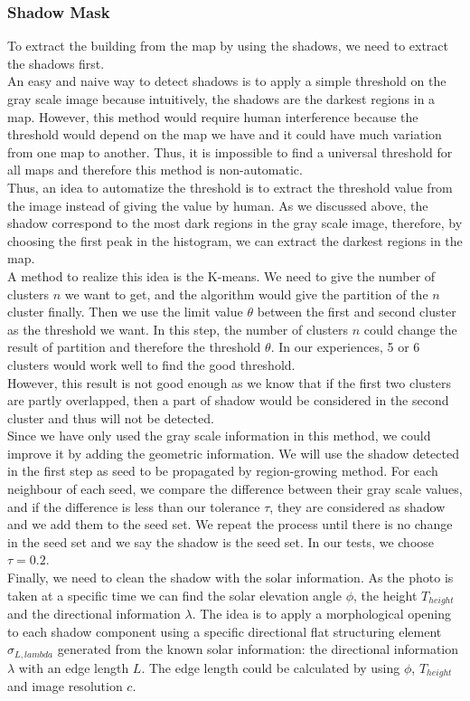 \documentclass[runningheads]{llncs}
\begin{document}
\subsubsection{Shadow Mask} 
To extract the building from the map by using the shadows, we need to extract the shadows first. \\
An easy and naive way to detect shadows is to apply a simple threshold on the gray scale image because intuitively, the shadows are the darkest regions in a map. However, this method would require human interference because the threshold would depend on the map we have and it could have much variation from one map to another. Thus, it is impossible to find a universal threshold for all maps and therefore this method is non-automatic.\\
Thus, an idea to automatize the threshold is to extract the threshold value from the image instead of giving the value by human. As we discussed above, the shadow correspond to the most dark regions in the gray scale image, therefore, by choosing the first peak in the histogram, we can extract the darkest regions in the map. \\
A method to realize this idea is the K-means. We need to give the number of clusters $n$ we want to get, and the algorithm would give the partition of the $n$ cluster finally. Then we use the limit value $\theta$ between the first and second cluster as the threshold we want. In this step, the number of clusters $n$ could change the result of partition and therefore the threshold $\theta$. In our experiences, 5 or 6 clusters would work well to find the good threshold.\\
However, this result is not good enough as we know that if the first two clusters are partly overlapped, then a part of shadow would be considered in the second cluster and thus will not be detected.\\ 
Since we have only used the gray scale information in this method, we could improve it by adding the geometric information. We will use the shadow detected in the first step as seed to be propagated by region-growing method. For each neighbour of each seed, we compare the difference between their gray scale values, and if the difference is less than our tolerance $\tau$, they are considered as shadow and we add them to the seed set. We repeat the process until there is no change in the seed set and we say the shadow is the seed set. In our tests, we choose $\tau =0.2$.\\
Finally, we need to clean the shadow with the solar information. As the photo is taken at a specific time we can find the solar elevation angle $\phi$, the height $T_{height}$ and the directional information $\lambda$. The idea is to apply a morphological opening to each shadow component using a specific directional flat structuring element $\sigma_{L,lambda}$ generated from the known solar information: the directional information $\lambda$ with an edge length $L$. The edge length could be calculated by using $\phi$, $T_{height}$ and image resolution $c$. \\
\end{document}
